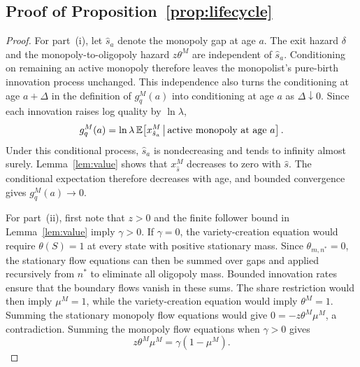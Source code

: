 \documentclass[12pt]{article}
\begin{document}
\subsection{Proof of Proposition~\ref{prop:lifecycle}}

\begin{proof}
For part~(i), let \(\hat s_a\) denote the monopoly gap at age \(a\). The exit
hazard \(\delta\) and the monopoly-to-oligopoly hazard \(z\theta^M\) are
independent of \(\hat s_a\). Conditioning on remaining an active monopoly
therefore leaves the monopolist's pure-birth innovation process unchanged.
This independence also turns the conditioning at age \(a+\Delta\) in the
definition of \(g_q^M(a)\) into conditioning at age \(a\) as
\(\Delta\downarrow0\). Since each innovation raises log quality by
\(\ln\lambda\),
\[
g_q^M(a)
=
\ln\lambda\,
\mathbb E\!\left[
x^M_{\hat s_a}
\,\middle|\,
\textnormal{active monopoly at age }a
\right].
\]
Under this conditional process, \(\hat s_a\) is nondecreasing and tends to
infinity almost surely. Lemma~\ref{lem:value} shows that
\(x^M_{\hat s}\) decreases to zero with \(\hat s\). The conditional
expectation therefore decreases with age, and bounded convergence gives
\(g_q^M(a)\to0\).

For part~(ii), first note that \(z>0\) and the finite follower bound in
Lemma~\ref{lem:value} imply \(\gamma>0\). If
\(\gamma=0\), the variety-creation equation would require
\(\theta(S)=1\) at every state with positive stationary mass. Since
\(\theta_{m,n^\ast}=0\), the stationary flow equations can then be summed over
gaps and applied recursively from \(n^\ast\) to eliminate all oligopoly mass.
Bounded innovation rates ensure that the boundary flows vanish in these sums.
The share restriction would then imply \(\mu^M=1\), while the
variety-creation equation would imply \(\theta^M=1\). Summing the stationary
monopoly flow equations would give \(0=-z\theta^M\mu^M\), a contradiction.
Summing the monopoly flow equations when \(\gamma>0\) gives
\[
z\theta^M\mu^M=\gamma(1-\mu^M).
\]


\end{proof}
\end{document}
